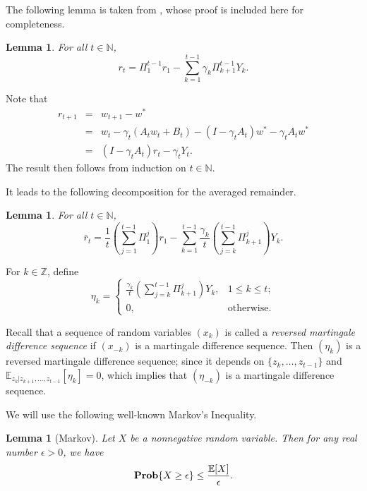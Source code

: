 \documentclass[twoside,twocolumn,journal]{IEEEtran}
\newtheorem{lem}[thm]{Lemma}
\newenvironment{pf}[1][Proof]{\medskip\noindent\hspace{1em}{\itshape #1: }}{\hspace*{\fill}~\QED\par\endtrivlist\medskip}
\newcommand{\DS}{\displaystyle}
\def\N{{\mathbb N}}
\def\Z{{\mathbb Z}}        %
\def\E{{\mathbb E}}        %
\def\Prob{{\bf Prob}}
\begin{document}
The following lemma is taken from \cite{SmaYao04}, whose proof is included here for completeness.

\medskip

\begin{lem}\label{lem:oldrt} For all $t\in \N$,
\[ r_{t} = \Pi_1^{t-1} r_1 - \sum_{k=1}^{t-1}\gamma_k  \Pi_{k+1}^{t-1} Y_k. \]
\end{lem}

\begin{pf} Note that
\begin{eqnarray*}
r_{t+1}& = & w_{t+1}- w^\ast \\
& = & w_t - \gamma_t (A_t w_t + B_t) - (I-\gamma_t A_t) w^\ast - \gamma_t A_t w^\ast \\
& = & (I-\gamma_t A_t) r_t - \gamma_t Y_t.
\end{eqnarray*}
The result then follows from induction on $t\in \N$.
\end{pf}

It leads to the following decomposition for
the averaged remainder.

\medskip

\begin{lem} For all $t\in \N$,
\[ \bar{r}_{t} = \frac{1}{t} \left(\sum_{j=1}^{t-1} \Pi_1^j \right) r_1 - \sum_{k=1}^{t-1}\frac{\gamma_k}{t}  \left(\sum_{j=k}^{t-1}\Pi_{k+1}^{j}\right) Y_k. \]
\end{lem}

\medskip

For $k\in \Z$, define
\[ \eta_k =
\left\{
\begin{array}{ll}
\DS \frac{\gamma_k}{t} \left(\sum_{j=k}^{t-1} \Pi_{k+1}^j\right)Y_k, & 1\leq k \leq t; \\
0, & \mbox{otherwise}.
\end{array}
\right.
\]

Recall that a sequence of random variables $(x_k)$ is called a \emph{reversed martingale difference sequence}
if $(x_{-k})$ is a martingale difference sequence. Then $(\eta_k)$
is a reversed martingale difference sequence; since it depends on $\{z_k,\ldots,z_{t-1}\}$ and $\E_{z_k|z_{k+1},\ldots,z_{t-1}}[\eta_k]=0$,
which implies that $(\eta_{-k})$ is a martingale difference sequence.

We will use the following well-known Markov's Inequality.

\medskip

\begin{lem}[Markov] Let $X$ be a nonnegative random variable.
Then for any real number $\epsilon>0$, we have
\[ \Prob\{ X\geq \epsilon \} \leq \frac{\E[X]}{\epsilon}. \]
\end{lem}
\end{document}
